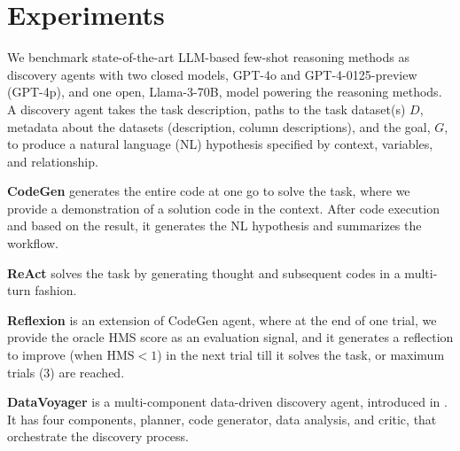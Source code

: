 \section{Experiments}
\label{sec:discovery_agents}
We benchmark state-of-the-art LLM-based few-shot reasoning methods as discovery agents with two closed models, GPT-4o and GPT-4-0125-preview (GPT-4p), and one open, Llama-3-70B, model powering the reasoning methods. A discovery agent takes the task description, paths to the task dataset(s) $D$, metadata about the datasets (description, column descriptions), and the goal, $G$, to produce a natural language (NL) hypothesis specified by context, variables, and relationship. 


\begin{ite}
    \item \textbf{CodeGen} generates the entire code at one go to solve the task, where we provide a demonstration of a solution code in the context. After code execution and based on the result, it generates the NL hypothesis and summarizes the workflow.
    \item \textbf{ReAct} \cite{yao2023react} solves the task by generating thought and subsequent codes in a multi-turn fashion.
    \item \textbf{Reflexion} \cite{Shinn2023ReflexionLA} is an extension of CodeGen agent, where at the end of one trial, we provide the oracle HMS score as an evaluation signal, and it generates a reflection to improve (when $\mathrm{HMS} < 1$) in the next trial till it solves the task, or maximum trials (3) are reached.
    \item \textbf{DataVoyager} is a multi-component data-driven discovery agent, introduced in \cite{majumder2024data}. It has four components, planner, code generator, data analysis, and critic, that orchestrate the discovery process.
\end{ite}

